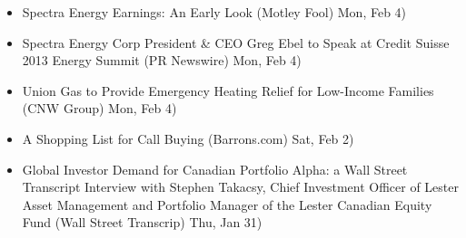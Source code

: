 \documentclass[11pt,asymmetric]{article}
\begin{document}
\begin{itemize}
\item Spectra Energy Earnings: An Early Look (Motley Fool) Mon, Feb 4)
\item Spectra Energy Corp President \& CEO Greg Ebel to Speak at Credit Suisse 2013 Energy Summit (PR Newswire) Mon, Feb 4)
\item Union Gas to Provide Emergency Heating Relief for Low-Income Families (CNW Group) Mon, Feb 4)
\item A Shopping List for Call Buying (Barrons.com) Sat, Feb 2)
\item Global Investor Demand for Canadian Portfolio Alpha: a Wall Street Transcript Interview with Stephen Takacsy, Chief Investment Officer of Lester Asset Management and Portfolio Manager of the Lester Canadian Equity Fund (Wall Street Transcrip) Thu, Jan 31)
\end{itemize}
\end{document}
